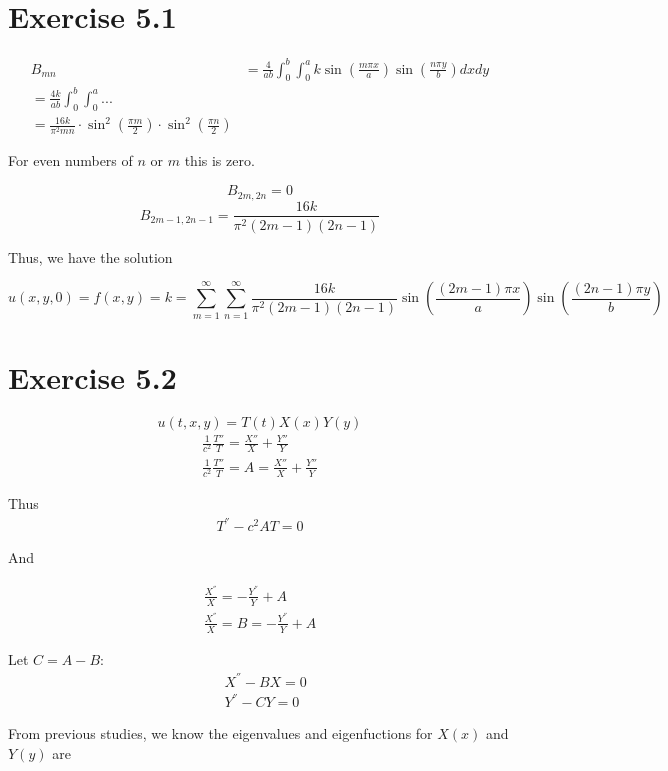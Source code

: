 \documentclass{article}
\begin{document}
\section*{Exercise 5.1}

\begin{align*}
B_{mn} &= \frac{4}{ab} \int_0^b \int_0^a k \sin \left( \frac{m\pi x}{a}\right) \sin\left( \frac{n \pi y}{b}\right) dx dy\\
= \frac{4k}{ab} \int_0^b \int_0^a ... \\
= \frac{16k}{\pi^2 m n} \cdot \sin^2\left(\frac{\pi m}{2}\right) \cdot \sin^2\left(\frac{\pi n}{2}\right)
\end{align*}

For even numbers of $n$ or $m$ this is zero.

$$B_{2m,2n} = 0$$
$$B_{2m-1,2n-1} = \frac{16k}{\pi^2(2m-1)(2n-1)}$$

Thus, we have the solution

$$u(x,y,0) = f(x,y) = k = \sum_{m=1}^{\infty} \sum_{n=1}^{\infty} \frac{16k}{\pi^2(2m-1)(2n-1)} \sin\left(\frac{(2m-1)\pi x}{a}\right)\sin\left(\frac{(2n-1)\pi y}{b}\right)$$


\section*{Exercise 5.2}

$$u(t,x,y) = T(t)X(x)Y(y)$$
\begin{align*}
\frac{1}{c^2}\frac{T''}{T}=\frac{X''}{X}+\frac{Y''}{Y} \\
\frac{1}{c^2}\frac{T''}{T}=A= \frac{X''}{X}+\frac{Y''}{Y}
\end{align*}

Thus
\begin{align*}
T^{''}-c^2AT=0
\end{align*}

And

\begin{align*}
\frac{X^{''}}{X} = - \frac{Y^{''}}{Y} + A\\
\frac{X^{''}}{X} = B = - \frac{Y^{''}}{Y} + A
\end{align*}

Let $C = A-B$:
\begin{align*}
&X^{''} - BX=0\\
&Y^{''} - CY=0
\end{align*}

From previous studies, we know the eigenvalues and eigenfuctions for $X(x)$ and $Y(y)$ are
\end{document}

